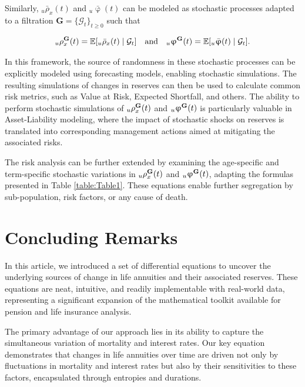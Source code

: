 \documentclass[12pt]{article}
\begin{document}
{Similarly, \( {}_u\bar{\rho}_x(t) \) and \( {}_u\bar{\upvarphi}(t) \) can be modeled as stochastic processes adapted to a filtration \( \textbf{G} = \{\mathcal{G}_t\}_{t \ge 0} \) such that 

\[
{}_u{\rho}^{\bf{G}}_x(t) = \mathbb{E}[{}_u\bar{\rho}_x(t) \mid \mathcal{G}_t] \quad \text{and} \quad {}_u{\upvarphi}^{\bf{G}}(t) = \mathbb{E}[{}_u\bar{\upvarphi}(t) \mid \mathcal{G}_t].
\]

In this framework, the source of randomness in these stochastic processes can be explicitly modeled using forecasting models, enabling stochastic simulations. The resulting simulations of changes in reserves can then be used to calculate common risk metrics, such as Value at Risk, Expected Shortfall, and others. The ability to perform stochastic simulations of \( {}_u{\rho}^{\bf{G}}_x(t) \) and \( {}_u{\upvarphi}^{\bf{G}}(t) \) is particularly valuable in Asset-Liability modeling, where the impact of stochastic shocks on reserves is translated into corresponding management actions aimed at mitigating the associated risks.

The risk analysis can be further extended by examining the age-specific and term-specific stochastic variations in \( {}_u{\rho}^{\bf{G}}_x(t) \) and \( {}_u{\upvarphi}^{\bf{G}}(t) \), adapting the formulas presented in Table \ref{table:Table1}. These equations enable further segregation by sub-population, risk factors, or any cause of death.



\section{Concluding Remarks}\label{sec:6_Conclusion}

In this article, we introduced a set of differential equations to uncover the underlying sources of change in life annuities and their associated reserves. These equations are neat, intuitive, and readily implementable with real-world data, representing a significant expansion of the mathematical toolkit available for pension and life insurance analysis.

The primary advantage of our approach lies in its ability to capture the simultaneous variation of mortality and interest rates. Our key equation demonstrates that changes in life annuities over time are driven not only by fluctuations in mortality and interest rates but also by their sensitivities to these factors, encapsulated through entropies and durations.

}
\end{document}

